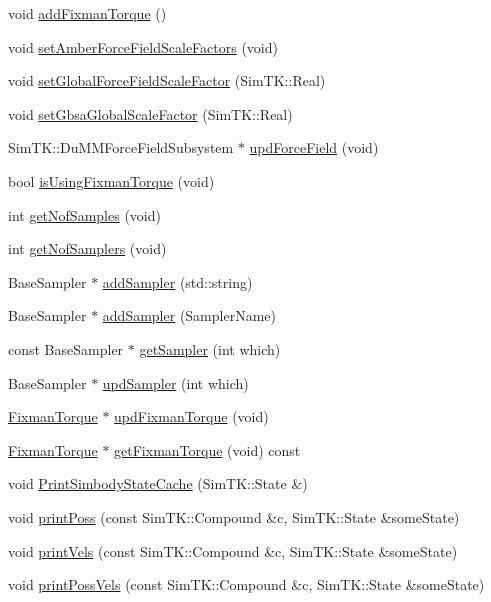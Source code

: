 \begin{DoxyCompactItemize}
\item 
void \hyperlink{classWorld_a8c3b18966e8f68d1f4e95f72229717bd}{add\+Fixman\+Torque} ()
\item 
void \hyperlink{classWorld_a6ec2e5a731fdedeb50066a7183d3a611}{set\+Amber\+Force\+Field\+Scale\+Factors} (void)
\item 
void \hyperlink{classWorld_ae6935057ff0b657b46e233e4af635b9f}{set\+Global\+Force\+Field\+Scale\+Factor} (Sim\+T\+K\+::\+Real)
\item 
void \hyperlink{classWorld_aa551dedf34c94145302d243b280122ab}{set\+Gbsa\+Global\+Scale\+Factor} (Sim\+T\+K\+::\+Real)
\item 
Sim\+T\+K\+::\+Du\+M\+M\+Force\+Field\+Subsystem $\ast$ \hyperlink{classWorld_a280165d3e24d0178a3fcd46864149efc}{upd\+Force\+Field} (void)
\item 
bool \hyperlink{classWorld_a4729653287f71760ba62f1a2b2ccf1a0}{is\+Using\+Fixman\+Torque} (void)
\item 
int \hyperlink{classWorld_add8943809f8160896ad33c6b33b716a1}{get\+Nof\+Samples} (void)
\item 
int \hyperlink{classWorld_ac0feb583f91eb5b844b8e4686c03d5e1}{get\+Nof\+Samplers} (void)
\item 
Base\+Sampler $\ast$ \hyperlink{classWorld_a9b96dc609f0f5200fb40ab798ae3ba63}{add\+Sampler} (std\+::string)
\item 
Base\+Sampler $\ast$ \hyperlink{classWorld_aacce8c70433c672b9f23ebb98b150ee9}{add\+Sampler} (Sampler\+Name)
\item 
const Base\+Sampler $\ast$ \hyperlink{classWorld_a53f849fe16026bbc02893dc28ae9d0e8}{get\+Sampler} (int which)
\item 
Base\+Sampler $\ast$ \hyperlink{classWorld_a3a52497539ba32fc205a94e1d3187617}{upd\+Sampler} (int which)
\item 
\hyperlink{classFixmanTorque}{Fixman\+Torque} $\ast$ \hyperlink{classWorld_a6fad7a67c4975e171e675d4fe979245b}{upd\+Fixman\+Torque} (void)
\item 
\hyperlink{classFixmanTorque}{Fixman\+Torque} $\ast$ \hyperlink{classWorld_a64203e9d832b1fdad7eb03bbed4e8f30}{get\+Fixman\+Torque} (void) const 
\item 
void \hyperlink{classWorld_aa0b30ed0088bf78621cae35160285554}{Print\+Simbody\+State\+Cache} (Sim\+T\+K\+::\+State \&)
\item 
void \hyperlink{classWorld_a3b7eebabe8824024af70a3d1175c0b97}{print\+Poss} (const Sim\+T\+K\+::\+Compound \&c, Sim\+T\+K\+::\+State \&some\+State)
\item 
void \hyperlink{classWorld_a8fd55c5c3f0e92e3af0c5658063ef470}{print\+Vels} (const Sim\+T\+K\+::\+Compound \&c, Sim\+T\+K\+::\+State \&some\+State)
\item 
void \hyperlink{classWorld_ad38f29681e5c31a523634dd23a73f075}{print\+Poss\+Vels} (const Sim\+T\+K\+::\+Compound \&c, Sim\+T\+K\+::\+State \&some\+State)
\end{DoxyCompactItemize}
